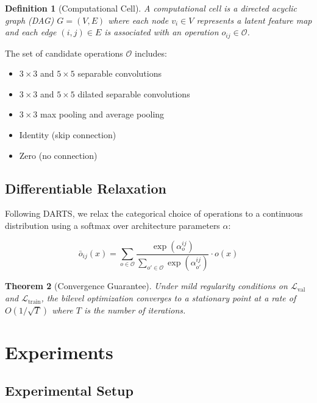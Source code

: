 \documentclass[12pt]{article}
\newtheorem{theorem}{Theorem}[section]
\newtheorem{definition}[theorem]{Definition}
\begin{document}
\begin{definition}[Computational Cell]
A computational cell is a directed acyclic graph (DAG) $G = (V, E)$ where each node $v_i \in V$ represents a latent feature map and each edge $(i, j) \in E$ is associated with an operation $o_{ij} \in \mathcal{O}$.
\end{definition}

The set of candidate operations $\mathcal{O}$ includes:
\begin{itemize}
  \item $3 \times 3$ and $5 \times 5$ separable convolutions
  \item $3 \times 3$ and $5 \times 5$ dilated separable convolutions
  \item $3 \times 3$ max pooling and average pooling
  \item Identity (skip connection)
  \item Zero (no connection)
\end{itemize}

\subsection{Differentiable Relaxation}

Following DARTS, we relax the categorical choice of operations to a continuous distribution using a softmax over architecture parameters $\alpha$:

\begin{equation}
  \bar{o}_{ij}(x) = \sum_{o \in \mathcal{O}} \frac{\exp(\alpha_o^{ij})}{\sum_{o' \in \mathcal{O}} \exp(\alpha_{o'}^{ij})} \cdot o(x)
\end{equation}

\begin{theorem}[Convergence Guarantee]
Under mild regularity conditions on $\mathcal{L}_{\text{val}}$ and $\mathcal{L}_{\text{train}}$, the bilevel optimization converges to a stationary point at a rate of $O(1/\sqrt{T})$ where $T$ is the number of iterations.
\end{theorem}

\section{Experiments}

\subsection{Experimental Setup}
\end{document}
